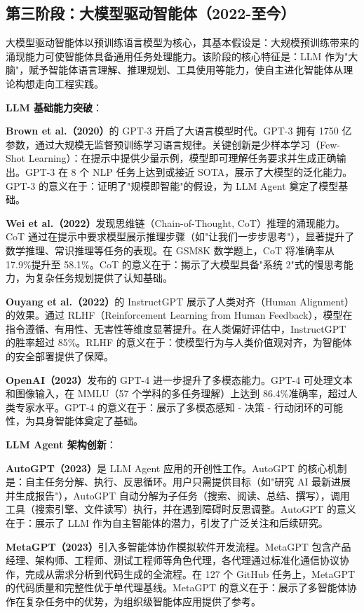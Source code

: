 \documentclass[12pt,a4paper]{article}
\begin{document}
\subsection{第三阶段：大模型驱动智能体（2022-至今）}

大模型驱动智能体以预训练语言模型为核心，其基本假设是：大规模预训练带来的涌现能力可使智能体具备通用任务处理能力。该阶段的核心特征是：LLM 作为"大脑"，赋予智能体语言理解、推理规划、工具使用等能力，使自主进化智能体从理论构想走向工程实践。

\textbf{LLM 基础能力突破}：

\textbf{Brown et al.（2020）}的 GPT-3 开启了大语言模型时代。GPT-3 拥有 1750 亿参数，通过大规模无监督预训练学习语言规律。关键创新是少样本学习（Few-Shot Learning）：在提示中提供少量示例，模型即可理解任务要求并生成正确输出。GPT-3 在 8 个 NLP 任务上达到或接近 SOTA，展示了大模型的泛化能力。GPT-3 的意义在于：证明了"规模即智能"的假设，为 LLM Agent 奠定了模型基础。

\textbf{Wei et al.（2022）}发现思维链（Chain-of-Thought, CoT）推理的涌现能力。CoT 通过在提示中要求模型展示推理步骤（如"让我们一步步思考"），显著提升了数学推理、常识推理等任务的表现。在 GSM8K 数学题上，CoT 将准确率从 17.9\%提升至 58.1\%。CoT 的意义在于：揭示了大模型具备"系统 2"式的慢思考能力，为复杂任务规划提供了认知基础。

\textbf{Ouyang et al.（2022）}的 InstructGPT 展示了人类对齐（Human Alignment）的效果。通过 RLHF（Reinforcement Learning from Human Feedback），模型在指令遵循、有用性、无害性等维度显著提升。在人类偏好评估中，InstructGPT 的胜率超过 85\%。RLHF 的意义在于：使模型行为与人类价值观对齐，为智能体的安全部署提供了保障。

\textbf{OpenAI（2023）}发布的 GPT-4 进一步提升了多模态能力。GPT-4 可处理文本和图像输入，在 MMLU（57 个学科的多任务理解）上达到 86.4\%准确率，超过人类专家水平。GPT-4 的意义在于：展示了多模态感知 - 决策 - 行动闭环的可能性，为具身智能体奠定了基础。

\textbf{LLM Agent 架构创新}：

\textbf{AutoGPT（2023）}是 LLM Agent 应用的开创性工作。AutoGPT 的核心机制是：自主任务分解、执行、反思循环。用户只需提供目标（如"研究 AI 最新进展并生成报告"），AutoGPT 自动分解为子任务（搜索、阅读、总结、撰写），调用工具（搜索引擎、文件读写）执行，并在遇到障碍时反思调整。AutoGPT 的意义在于：展示了 LLM 作为自主智能体的潜力，引发了广泛关注和后续研究。

\textbf{MetaGPT（2023）}引入多智能体协作模拟软件开发流程。MetaGPT 包含产品经理、架构师、工程师、测试工程师等角色代理，各代理通过标准化通信协议协作，完成从需求分析到代码生成的全流程。在 127 个 GitHub 任务上，MetaGPT 的代码质量和完整性优于单代理基线。MetaGPT 的意义在于：展示了多智能体协作在复杂任务中的优势，为组织级智能体应用提供了参考。
\end{document}
